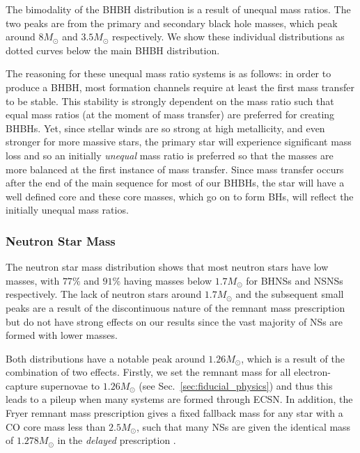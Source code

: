 The bimodality of the BHBH distribution is a result of unequal mass ratios. The two peaks are from the primary and secondary black hole masses, which peak around $8 \unit{M_{\odot}}$ and $3.5 \unit{M_{\odot}}$ respectively. We show these individual distributions as dotted curves below the main BHBH distribution.

The reasoning for these unequal mass ratio systems is as follows: in order to produce a BHBH, most formation channels require at least the first mass transfer to be stable. This stability is strongly dependent on the mass ratio such that equal mass ratios (at the moment of mass transfer) are preferred for creating BHBHs. Yet, since stellar winds are so strong at high metallicity, and even stronger for more massive stars, the primary star will experience significant mass loss and so an initially \textit{unequal} mass ratio is preferred so that the masses are more balanced at the first instance of mass transfer. Since mass transfer occurs after the end of the main sequence for most of our BHBHs, the star will have a well defined core and these core masses, which go on to form BHs, will reflect the initially unequal mass ratios.

\subsubsection{Neutron Star Mass}
The neutron star mass distribution shows that most neutron stars have low masses, with $77\%$ and $91\%$ having masses below $1.7 \unit{M_{\odot}}$ for BHNSs and NSNSs respectively. The lack of neutron stars around $1.7 \unit{M_{\odot}}$ and the subsequent small peaks are a result of the discontinuous nature of the \citet{Fryer+2012} remnant mass prescription but do not have strong effects on our results since the vast majority of NSs are formed with lower masses.

Both distributions have a notable peak around $1.26 \unit{M_{\odot}}$, which is a result of the combination of two effects. Firstly, we set the remnant mass for all electron-capture supernovae to $1.26 \unit{M_\odot}$ (see Sec.~\ref{sec:fiducial_physics}) and thus this leads to a pileup when many systems are formed through ECSN. In addition, the Fryer remnant mass prescription gives a fixed fallback mass for any star with a CO core mass less than $2.5 \unit{M_\odot}$, such that many NSs are given the identical mass of $1.278 \unit{M_\odot}$ in the \textit{delayed} prescription \citep[see][Eq.~19]{Fryer+2012}. 

